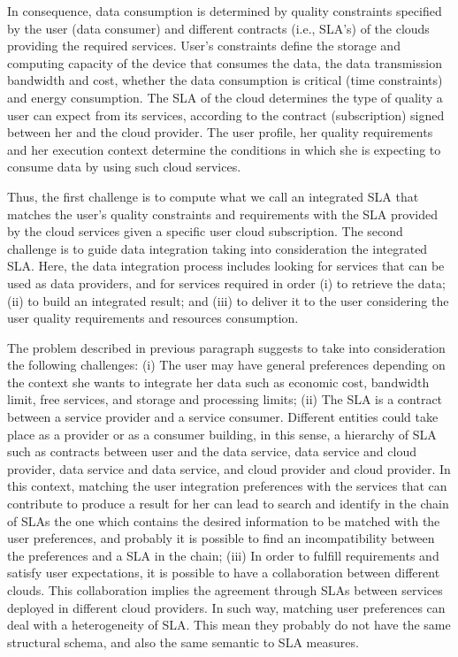 \documentclass[11pt,a4paper,oneside]{report}
\begin{document}
In consequence, data consumption is determined by quality constraints specified by the user (data consumer) and different contracts (i.e., SLA's) of the clouds providing the required services. User's constraints define the storage and computing capacity of the device that consumes the data, the data transmission bandwidth and cost, whether the data consumption is critical (time constraints) and energy consumption. The SLA of the cloud determines the type of quality a user can expect from its services, according to the contract (subscription) signed between her and the cloud provider. The user profile, her quality requirements and her execution context determine the conditions in which she is expecting to consume data by using such cloud services.

Thus, the first challenge is to compute what we call an integrated SLA that matches the user’s quality constraints and requirements with the SLA provided by the cloud services given a specific user cloud subscription. The second challenge is to guide data integration taking into consideration the integrated SLA. Here, the data integration process includes looking for services that can be used as data providers, and for services required in order (i) to retrieve the data; (ii) to build an integrated result; and (iii) to deliver it to the user considering the user quality requirements and resources consumption.

The problem described in previous paragraph suggests to take into consideration the following challenges:
(i) The user may have general preferences depending on the context she wants to integrate her data such as economic cost, bandwidth limit, free services, and storage and processing limits; 
(ii) The SLA is a contract between a service provider and a service consumer. Different entities could take place as a provider or as a consumer building, in this sense, a hierarchy of SLA such as contracts between user and the data service, data service and cloud provider, data service and data service, and cloud provider and cloud provider. In this context, matching the user integration preferences with the services that can contribute to produce a result for her can lead to search and identify in the chain of SLAs the one which contains the desired information to be matched with the user preferences, and probably it is possible to find an incompatibility between the preferences and a SLA in the chain; 
(iii) In order to fulfill requirements and satisfy user expectations, it is possible to have a collaboration between different clouds. This collaboration implies the agreement through SLAs between services deployed in different cloud providers. In such way, matching user preferences can deal with a heterogeneity of SLA. This mean they probably do not have the same structural schema, and also the same semantic to SLA measures.  
\end{document}
